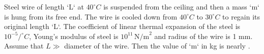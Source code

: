 
\item Steel wire of length `L` at \(40^\circ C\) is suspended from the ceiling and then a mass `m` is hung from its free end. The wire is cooled down from \(40^\circ C\) to \(30^\circ C\) to regain its original length `L`. The coefficient of linear thermal expansion of the steel is \(10^{-5} / ^\circ C\), Young's modulus of steel is \(10^{11} \, \text{N/m}^2\) and radius of the wire is 1 mm. Assume that \( L \gg \) diameter of the wire. Then the value of `m` in kg is nearly \underline{\hspace{2.5cm}}.
